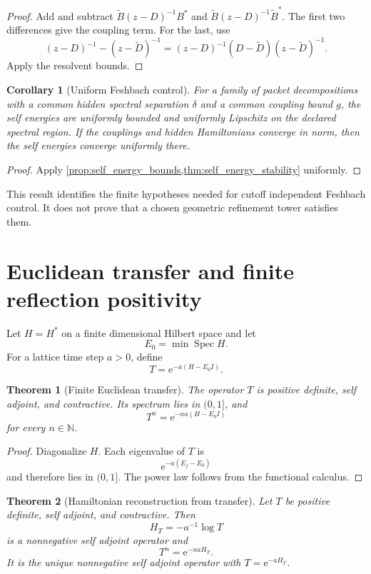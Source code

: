 \documentclass{aomart}
\newtheorem{theorem}{Theorem}[section]
\newtheorem{corollary}[corollary]{Corollary}
\theoremstyle{definition}
\theoremstyle{remark}
\newcommand{\NN}{\mathbb N}
\newcommand{\Spec}{\operatorname{Spec}}
\newcommand{\e}{\mathrm e}
\begin{document}
\begin{proof}
Add and subtract \(\widetilde B(z-D)^{-1}B^*\) and \(\widetilde B(z-D)^{-1}\widetilde B^*\). The first two differences give the coupling term. For the last, use
\[
(z-D)^{-1}-(z-\widetilde D)^{-1}
=(z-D)^{-1}(D-\widetilde D)(z-\widetilde D)^{-1}.
\]
Apply the resolvent bounds.
\end{proof}

\begin{corollary}[Uniform Feshbach control]\label{cor:uniform_feshbach}
For a family of packet decompositions with a common hidden spectral separation \(\delta\) and a common coupling bound \(g\), the self energies are uniformly bounded and uniformly Lipschitz on the declared spectral region. If the couplings and hidden Hamiltonians converge in norm, then the self energies converge uniformly there.
\end{corollary}

\begin{proof}
Apply \cref{prop:self_energy_bounds,thm:self_energy_stability} uniformly.
\end{proof}

This result identifies the finite hypotheses needed for cutoff independent Feshbach control. It does not prove that a chosen geometric refinement tower satisfies them.

\section{Euclidean transfer and finite reflection positivity}\label{sec:euclidean}

Let \(H=H^*\) on a finite dimensional Hilbert space and let
\[
E_0=\min\Spec H.
\]
For a lattice time step \(a>0\), define
\[
T=\e^{-a(H-E_0I)}.
\]

\begin{theorem}[Finite Euclidean transfer]\label{thm:euclidean_transfer}
The operator \(T\) is positive definite, self adjoint, and contractive. Its spectrum lies in \((0,1]\), and
\[
T^n=\e^{-na(H-E_0I)}
\]
for every \(n\in\NN\).
\end{theorem}

\begin{proof}
Diagonalize \(H\). Each eigenvalue of \(T\) is
\[
\e^{-a(E_j-E_0)}
\]
and therefore lies in \((0,1]\). The power law follows from the functional calculus.
\end{proof}

\begin{theorem}[Hamiltonian reconstruction from transfer]\label{thm:transfer_logarithm}
Let \(T\) be positive definite, self adjoint, and contractive. Then
\[
H_T=-a^{-1}\log T
\]
is a nonnegative self adjoint operator and
\[
T^n=\e^{-naH_T}.
\]
It is the unique nonnegative self adjoint operator with \(T=\e^{-aH_T}\).
\end{theorem}
\end{document}
